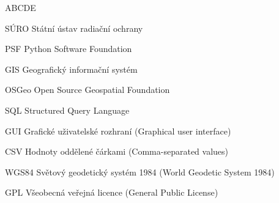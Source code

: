 
\begin{seznamzkratek}{ABCDE}

	      {SÚRO}
	      {Státní ústav radiační ochrany}
	      
		  {PSF}
	      {Python Software Foundation}

	      {GIS}
	      {Geografický informační systém}

	      {OSGeo}
	      {Open Source Geospatial Foundation}

	      {SQL}
	      {Structured Query Language}
	      
	      {GUI}
	      {Grafické uživatelské rozhraní (Graphical user interface)}
	      
	      {CSV}
	      {Hodnoty oddělené čárkami (Comma-separated values)}
	      
	      {WGS84}
	      {Světový geodetický systém 1984 (World Geodetic System 1984)}

	      {GPL}
	      {Všeobecná veřejná licence (General Public License)}

\end{seznamzkratek}